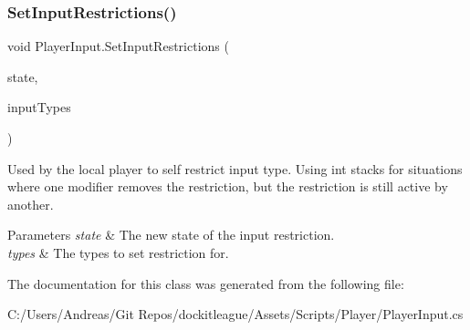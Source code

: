 \subsubsection{\texorpdfstring{Set\+Input\+Restrictions()}{SetInputRestrictions()}}
{\footnotesize\ttfamily void Player\+Input.\+Set\+Input\+Restrictions (\begin{DoxyParamCaption}\item[{bool}]{state,  }\item[{Input\+Type \mbox{[}$\,$\mbox{]}}]{input\+Types }\end{DoxyParamCaption})}



Used by the local player to self restrict input type. Using int stacks for situations where one modifier removes the restriction, but the restriction is still active by another. 


\begin{DoxyParams}{Parameters}
{\em state} & The new state of the input restriction.\\
\hline
{\em types} & The types to set restriction for.\\
\hline
\end{DoxyParams}


The documentation for this class was generated from the following file\+:\begin{DoxyCompactItemize}
\item 
C\+:/\+Users/\+Andreas/\+Git Repos/dockitleague/\+Assets/\+Scripts/\+Player/Player\+Input.\+cs\end{DoxyCompactItemize}
